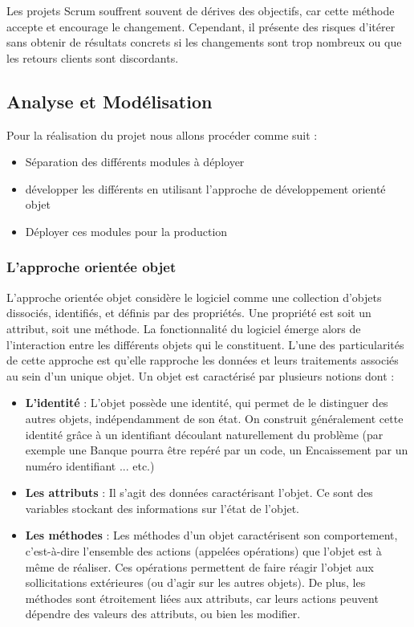 Les projets Scrum souffrent souvent de dérives des objectifs, car cette méthode accepte et encourage le changement. Cependant, il présente des risques d’itérer sans obtenir de résultats concrets si les changements sont trop nombreux ou que les retours clients sont discordants.

\subsection{Analyse et Modélisation}

Pour la réalisation du projet nous allons procéder comme suit :

\vspace{1em}
\begin{itemize}
	\setlength\itemsep{1em}
	\item Séparation des différents modules à déployer
	\item développer les différents en utilisant l'approche de développement orienté objet
	\item Déployer ces modules pour la production
\end{itemize}

\subsubsection{L’approche orientée objet}

L’approche orientée objet considère le logiciel comme une collection d’objets dissociés,
identifiés, et définis par des propriétés. Une propriété est soit un attribut, soit une méthode.
La fonctionnalité du logiciel émerge alors de l’interaction entre les différents objets qui le
constituent. L’une des particularités de cette approche est qu’elle rapproche les données et
leurs traitements associés au sein d’un unique objet. Un objet est caractérisé par plusieurs
notions dont :

\vspace{1em}
\begin{itemize}
	\setlength\itemsep{1em}
	\item \textbf{L’identité} : L’objet possède une identité, qui permet de le distinguer des autres objets, indépendamment de son état. On construit généralement cette identité grâce à un identifiant
	      découlant naturellement du problème (par exemple une Banque pourra être repéré par un code,
	      un Encaissement par un numéro identifiant ... etc.)
	\item \textbf{Les attributs} : Il s’agit des données caractérisant l’objet. Ce sont des variables stockant des
	      informations sur l’état de l’objet.
	\item \textbf{Les méthodes} : Les méthodes d’un objet caractérisent son comportement, c’est-à-dire l’ensemble
	      des actions (appelées opérations) que l’objet est à même de réaliser. Ces opérations permettent
	      de faire réagir l’objet aux sollicitations extérieures (ou d’agir sur les autres objets). De plus, les
	      méthodes sont étroitement liées aux attributs, car leurs actions peuvent dépendre des valeurs
	      des attributs, ou bien les modifier.
\end{itemize}

